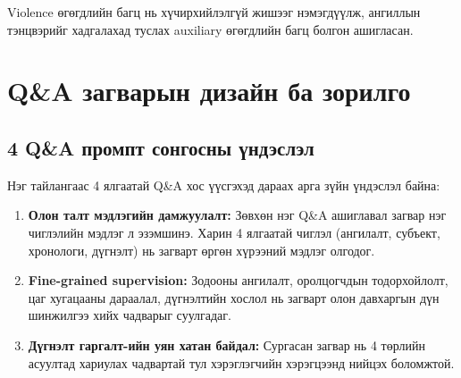 \begin{table}[htbp]
\centering
\caption{Violence өгөгдлийн багцын статистик}
\label{tab:hockey_stats}
\end{table}

Violence өгөгдлийн багц нь хүчирхийлэлгүй жишээг нэмэгдүүлж, ангиллын тэнцвэрийг хадгалахад туслах auxiliary өгөгдлийн багц болгон ашигласан.
\section{Q\&A загварын дизайн ба зорилго}

\subsection{4 Q\&A промпт сонгосны үндэслэл}

Нэг тайлангаас 4 ялгаатай Q\&A хос үүсгэхэд дараах арга зүйн үндэслэл байна:

\begin{enumerate}
    \item \textbf{Олон талт мэдлэгийн дамжуулалт:} Зөвхөн нэг Q\&A ашиглавал загвар нэг чиглэлийн мэдлэг л эзэмшинэ. Харин 4 ялгаатай чиглэл (ангилалт, субъект, хронологи, дүгнэлт) нь загварт өргөн хүрээний мэдлэг олгодог.
    \item \textbf{Fine-grained supervision:} Зодооны ангилалт, оролцогчдын тодорхойлолт, цаг хугацааны дараалал, дүгнэлтийн хослол нь загварт олон давхаргын дүн шинжилгээ хийх чадварыг суулгадаг.

    \item \textbf{Дүгнэлт гаргалт-ийн уян хатан байдал:} Сургасан загвар нь 4 төрлийн асуултад хариулах чадвартай тул хэрэглэгчийн хэрэгцээнд нийцэх боломжтой.
\end{enumerate}


